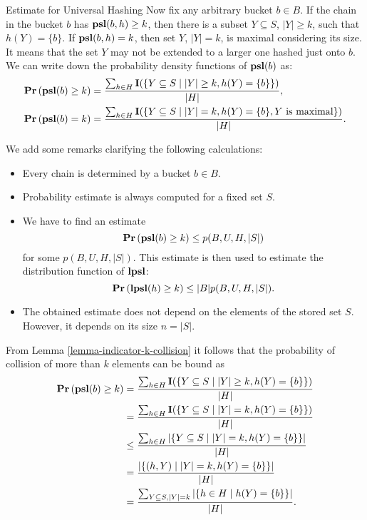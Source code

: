 \begin{section}{Estimate for Universal Hashing}
Now fix any arbitrary bucket $b \in B$. If the chain in the bucket $b$ has $\mathbf{psl}(b, h) \geq k$, then there is a subset $Y \subseteq S$, $|Y| \geq k$, such that $h(Y) = \{ b \}$. If $\mathbf{psl}(b, h) = k$, then set $Y$, $|Y| = k$, is maximal considering its size. It means that the set $Y$ may not be extended to a larger one hashed just onto $b$. We can write down the probability density functions of $\mathbf{psl}(b)$ as:
\begin{displaymath}
\begin{split}
\mathbf{Pr}\left(\mathbf{psl}(b) \geq k\right) & = \frac{\sum\displaylimits_{h \in H} \mathbf{I}(\{ Y \subseteq S \mid |Y| \geq k, h(Y) = \{ b \} \})}{|H|} \text{,} \\
\mathbf{Pr}\left(\mathbf{psl}(b) = k\right) & = \frac{\sum\displaylimits_{h \in H} \mathbf{I}(\{ Y \subseteq S \mid |Y| = k, h(Y) = \{ b \}, Y \text{ is maximal} \})}{|H|} \text{.}
\end{split}
\end{displaymath}

We add some remarks clarifying the following calculations:
\begin{itemize}
\item Every chain is determined by a bucket $b \in B$.
\item Probability estimate is always computed for a fixed set $S$.
\item We have to find an estimate \[ \mathbf{Pr}\left(\mathbf{psl}(b) \geq k\right) \leq p(B, U, H, |S|) \] for some $p(B,U,H,|S|)$. This estimate is then used to estimate the distribution function of $\mathbf{lpsl}$: \[ \mathbf{Pr}\left(\mathbf{lpsl}(h) \geq k\right) \leq |B| p(B, U, H, |S|) \text{.} \] 
\item The obtained estimate does not depend on the elements of the stored set $S$. However, it depends on its size $n = |S|$.
\end{itemize}

From Lemma \ref{lemma-indicator-k-collision} it follows that the probability of collision of more than $k$ elements can be bound as
\begin{displaymath}
\begin{split}
\mathbf{Pr}\left(\mathbf{psl}(b) \geq k\right)
	& = \frac{\sum\displaylimits_{h \in H} \mathbf{I}(\{ Y \subseteq S \mid |Y| \geq k, h(Y) = \{ b \} \})}{|H|} \\
	& = \frac{\sum\displaylimits_{h \in H} \mathbf{I}(\{ Y \subseteq S \mid |Y| = k, h(Y) = \{ b \} \})}{|H|} \\
	& \leq \frac{\sum\displaylimits_{h \in H} |\{ Y \subseteq S \mid |Y| = k, h(Y) = \{ b \} \}|}{|H|} \\
	& = \frac{|\{ (h, Y) \mid |Y| = k, h(Y) = \{ b \} \}|}{|H|} \\
	& = \frac{\sum\displaylimits_{Y \subseteq S, |Y| = k} | \{ h \in H \mid h(Y) = \{ b \} \}|}{|H|} \text{.}
\end{split}
\end{displaymath}


\end{section}
